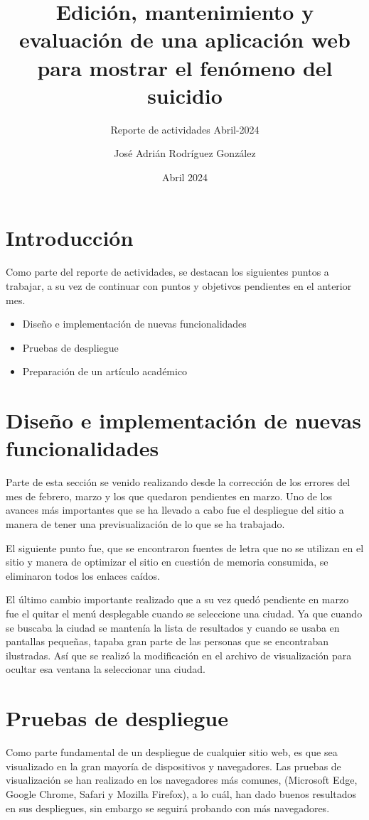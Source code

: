 \documentclass[11pt,DIV=9, letterpaper, oneside, openright]{scrartcl}
\title{Edición, mantenimiento y evaluación de una aplicación web para mostrar el fenómeno del suicidio}
\subtitle{Reporte de actividades Abril-2024}
\author{José Adrián Rodríguez González }
\date{Abril 2024}
\begin{document}
\maketitle

\section{Introducción}
Como parte del reporte de actividades, se destacan los siguientes puntos a trabajar, a su vez de continuar con puntos y objetivos pendientes en el anterior mes.

\begin{itemize}
    \item Diseño e implementación de nuevas funcionalidades
    \item Pruebas de despliegue
    \item Preparación de un artículo académico
\end{itemize}

\section{Diseño e implementación de nuevas funcionalidades}

Parte de esta sección se venido realizando desde la corrección de los errores del mes de febrero, marzo y los que quedaron pendientes en marzo.
Uno de los avances más importantes que se ha llevado a cabo fue el despliegue del sitio a manera de tener una previsualización de lo que se ha trabajado.

El siguiente punto fue, que se encontraron fuentes de letra que no se utilizan en el sitio y manera de optimizar el sitio en cuestión de memoria consumida, se eliminaron todos los enlaces  caídos.

El último cambio importante realizado que a su vez quedó pendiente en marzo fue el quitar el menú desplegable cuando se seleccione una ciudad. Ya que cuando se buscaba la ciudad se mantenía la lista de resultados y cuando se usaba en pantallas pequeñas, tapaba gran parte de las personas que se encontraban ilustradas.
Así que se realizó la modificación en el archivo de visualización para ocultar esa ventana la seleccionar una ciudad.

\section{Pruebas de despliegue}

Como parte fundamental de un despliegue de cualquier sitio web, es que sea visualizado en la gran mayoría de dispositivos y navegadores. Las pruebas de visualización se han realizado en los navegadores más comunes, (Microsoft Edge, Google Chrome, Safari y Mozilla Firefox), a lo cuál, han dado buenos resultados en sus despliegues, sin embargo se seguirá probando con más navegadores.
\end{document}
